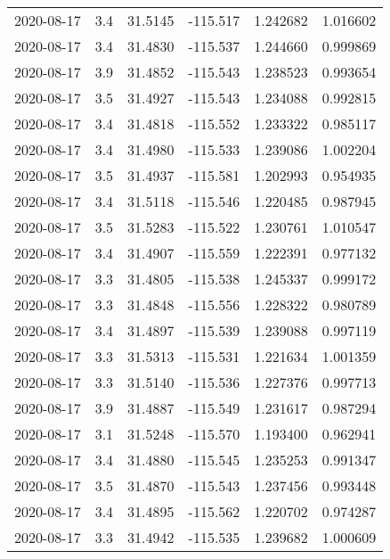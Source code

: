 \begin{tabular}{lrrrrr}
2020-08-17 &       3.4 &  31.5145 &  -115.517 &         1.242682 &         1.016602 \\
2020-08-17 &       3.4 &  31.4830 &  -115.537 &         1.244660 &         0.999869 \\
2020-08-17 &       3.9 &  31.4852 &  -115.543 &         1.238523 &         0.993654 \\
2020-08-17 &       3.5 &  31.4927 &  -115.543 &         1.234088 &         0.992815 \\
2020-08-17 &       3.4 &  31.4818 &  -115.552 &         1.233322 &         0.985117 \\
2020-08-17 &       3.4 &  31.4980 &  -115.533 &         1.239086 &         1.002204 \\
2020-08-17 &       3.5 &  31.4937 &  -115.581 &         1.202993 &         0.954935 \\
2020-08-17 &       3.4 &  31.5118 &  -115.546 &         1.220485 &         0.987945 \\
2020-08-17 &       3.5 &  31.5283 &  -115.522 &         1.230761 &         1.010547 \\
2020-08-17 &       3.4 &  31.4907 &  -115.559 &         1.222391 &         0.977132 \\
2020-08-17 &       3.3 &  31.4805 &  -115.538 &         1.245337 &         0.999172 \\
2020-08-17 &       3.3 &  31.4848 &  -115.556 &         1.228322 &         0.980789 \\
2020-08-17 &       3.4 &  31.4897 &  -115.539 &         1.239088 &         0.997119 \\
2020-08-17 &       3.3 &  31.5313 &  -115.531 &         1.221634 &         1.001359 \\
2020-08-17 &       3.3 &  31.5140 &  -115.536 &         1.227376 &         0.997713 \\
2020-08-17 &       3.9 &  31.4887 &  -115.549 &         1.231617 &         0.987294 \\
2020-08-17 &       3.1 &  31.5248 &  -115.570 &         1.193400 &         0.962941 \\
2020-08-17 &       3.4 &  31.4880 &  -115.545 &         1.235253 &         0.991347 \\
2020-08-17 &       3.5 &  31.4870 &  -115.543 &         1.237456 &         0.993448 \\
2020-08-17 &       3.4 &  31.4895 &  -115.562 &         1.220702 &         0.974287 \\
2020-08-17 &       3.3 &  31.4942 &  -115.535 &         1.239682 &         1.000609 \\

\end{tabular}
